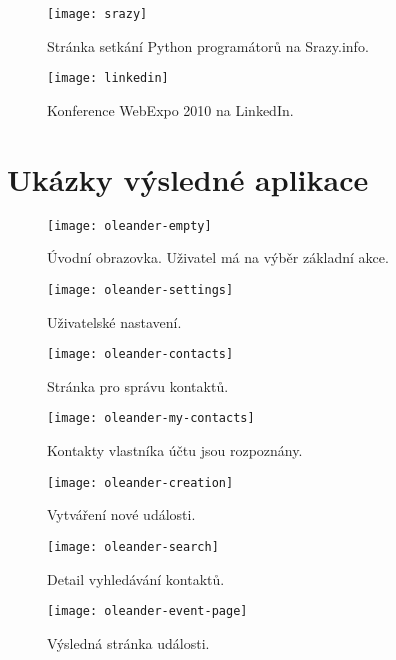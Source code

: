 \documentclass[12pt,oneside,final]{fithesis2}
\begin{document}
\begin{figure}[h]
    \texttt{[image: srazy]}
    \caption{Stránka setkání Python programátorů na Srazy.info.}
\end{figure}

\begin{figure}[h]
    \texttt{[image: linkedin]}
    \caption{Konference WebExpo 2010 na LinkedIn.}
\end{figure}



\chapter{Ukázky výsledné aplikace}\label{oleanderPictures}

\begin{figure}[h]
    \centering
    \texttt{[image: oleander-empty]}
    \caption{Úvodní obrazovka. Uživatel má na výběr základní akce.}
\end{figure}

\begin{figure}[h]
    \centering
    \texttt{[image: oleander-settings]}
    \caption{Uživatelské nastavení.}
\end{figure}

\begin{figure}[h]
    \centering
    \texttt{[image: oleander-contacts]}
    \caption{Stránka pro správu kontaktů.}
\end{figure}

\begin{figure}[h]
    \centering
    \texttt{[image: oleander-my-contacts]}
    \caption{Kontakty vlastníka účtu jsou rozpoznány.}
\end{figure}

\begin{figure}[h]
    \centering
    \texttt{[image: oleander-creation]}
    \caption{Vytváření nové události.}
\end{figure}

\begin{figure}[h]
    \centering
    \texttt{[image: oleander-search]}
    \caption{Detail vyhledávání kontaktů.}
\end{figure}

\begin{figure}[h]
    \centering
    \texttt{[image: oleander-event-page]}
    \caption{Výsledná stránka události.}
\end{figure}
\end{document}
